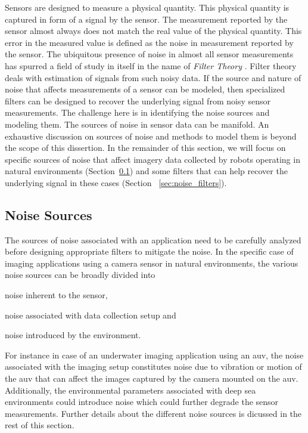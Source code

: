 \documentclass {udthesis}
\begin{document}
Sensors are designed to measure a physical quantity. This physical quantity is captured in form of a signal by the sensor.
The measurement reported by the sensor almost always does not match the real value of the physical quantity.
This error in the measured value is defined as the noise in measurement reported by the sensor.
The ubiquitous presence of noise in almost all sensor measurements has spurred a field of study in itself in the name of 
\emph{Filter Theory} \cite{haykin}. Filter theory deals with estimation of signals from such noisy data. 
If the source and nature of noise that affects measurements of a sensor can be modeled, then specialized
filters can be designed to recover the underlying signal from noisy sensor measurements.
The challenge here is in identifying the noise sources and modeling them. 
The sources of noise in sensor data can be manifold. An exhaustive discussion on sources of noise and methods to model them
is beyond the scope of this dissertion. In the remainder of this section, we will focus on specific sources of noise that affect 
imagery data collected by robots operating in natural environments (Section~\ref{sec:noise_sources}) and some filters that can 
help recover the underlying signal in these cases (Section ~\ref{sec:noise_filters}).

\subsection{Noise Sources}
\label{sec:noise_sources}

The sources of noise associated with an application need to be carefully analyzed before designing appropriate filters to mitigate the noise.
In the specific case of imaging applications using a camera sensor in natural environments, the various noise sources can be broadly divided
into \begin{enumerate*}[label=(\roman*)] \item noise inherent to the sensor, \item noise associated with data collection setup and \item noise introduced by the environment. \end{enumerate*} For instance in case of an underwater imaging application using an \gls{auv}, the noise associated with the imaging setup constitutes noise due to vibration or motion of the \gls{auv} that can affect the images captured by the camera mounted on the \gls{auv}. Additionally, the environmental parameters associated with deep sea environments could introduce noise which could further degrade the sensor measurements. Further details about the different noise sources is dicussed in the rest of this section.
\end{document}
